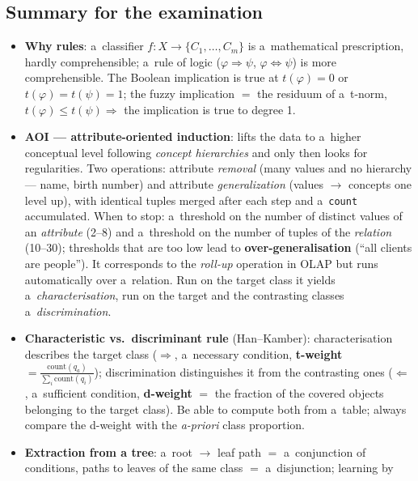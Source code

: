 \documentclass[11pt,a4paper]{article}
\theoremstyle{definition}
\providecommand{\uv}[1]{``#1''}
\begin{document}
\subsection{Summary for the examination}

\begin{itemize}
\item \textbf{Why rules}: a~classifier $f\colon X\to\{C_1,\dots,C_m\}$ is
      a~mathematical prescription, hardly comprehensible; a~rule of logic
      ($\varphi\Rightarrow\psi$, $\varphi\Leftrightarrow\psi$) is more comprehensible.
      The Boolean implication is true at $t(\varphi)=0$ or $t(\varphi)=t(\psi)=1$; the
      fuzzy implication $=$ the residuum of a~t-norm, $t(\varphi)\le
      t(\psi)\Rightarrow$ the implication is true to degree 1.
\item \textbf{AOI --- attribute-oriented induction}: lifts the data to a~higher conceptual
      level following \emph{concept hierarchies} and only then looks for regularities. Two
      operations: attribute \emph{removal} (many values and no hierarchy --- name, birth
      number) and attribute \emph{generalization} (values $\to$ concepts one level up),
      with identical tuples merged after each step and a~\texttt{count} accumulated. When
      to stop: a~threshold on the number of distinct values of an \emph{attribute} (2--8)
      and a~threshold on the number of tuples of the \emph{relation} (10--30); thresholds
      that are too low lead to \textbf{over-generalisation} (\uv{all clients are people}).
      It corresponds to the \emph{roll-up} operation in OLAP but runs automatically over
      a~relation. Run on the target class it yields a~\emph{characterisation}, run on the
      target and the contrasting classes a~\emph{discrimination}.
\item \textbf{Characteristic vs.\ discriminant rule} (Han--Kamber): characterisation
      describes the target class ($\Rightarrow$, a~necessary condition,
      \textbf{t-weight} $=\frac{\mathrm{count}(q_a)}{\sum_i\mathrm{count}(q_i)}$);
      discrimination distinguishes it from the contrasting ones ($\Leftarrow$,
      a~sufficient condition, \textbf{d-weight} $=$ the fraction of the covered objects
      belonging to the target class). Be able to compute both from a~table; always
      compare the d-weight with the \emph{a-priori} class proportion.
\item \textbf{Extraction from a tree}: a~root $\to$ leaf path $=$ a~conjunction of
      conditions, paths to leaves of the same class $=$ a~disjunction; learning by

\end{itemize}
\end{document}
